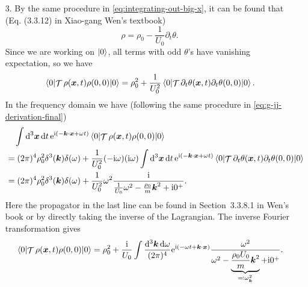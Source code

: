 \documentclass[hyperref, a4paper]{article}
\DeclareMathOperator{\timeorder}{\mathcal{T}}
\newcommand*{\ii}{\mathrm{i}}
\newcommand*{\ee}{\mathrm{e}}
\begin{document}
\begin{enumerate}
\item[3.] By the same procedure in \eqref{eq:integrating-out-big-x},
it can be found that (Eq. (3.3.12) in Xiao-gang Wen's textbook) 
\begin{equation}
    \rho = \rho_0 - \frac{1}{U_0} \partial_t \theta.
\end{equation}
Since we are working on $\ket{0}$,
all terms with odd $\theta$'s have vanishing expectation,
so we have 
\begin{equation}
    \expval{\timeorder \rho(\vb*{x}, t) \rho(0, 0)}{0} 
    = \rho_0^2 + \frac{1}{U_0^2} \expval{\timeorder \partial_t \theta(\vb*{x}, t) \partial_t \theta (0, 0)}{0}.
\end{equation}
In the frequency domain we have (following the same procedure in \eqref{eq:g-jj-derivation-final})
\begin{equation}
    \begin{aligned}
        &\quad \int \dd[3]{\vb*{x}} \dd{t} \ee^{\ii (- \vb*{k} \cdot \vb*{x} + \omega t)} 
        \expval{\timeorder \rho(\vb*{x}, t) \rho(0, 0)}{0}  \\
        &= (2\pi)^4 \rho_0^2 \delta^3(\vb*{k}) \delta(\omega)
        + \frac{1}{U_0^2} (-\ii \omega) (\ii \omega) 
        \int \dd[3]{\vb*{x}} \dd{t} \ee^{\ii (- \vb*{k} \cdot \vb*{x} + \omega t)} 
        \expval{\timeorder \partial_t \theta(\vb*{x}, t) \partial_t \theta (0, 0)}{0} \\
        &= (2\pi)^4 \rho_0^2 \delta^3(\vb*{k}) \delta(\omega)
        + \frac{1}{U_0^2} \omega^2 \frac{\ii}{ \frac{1}{U_0} \omega^2 - \frac{\rho_0}{m} \vb*{k}^2 + \ii 0^+ }.
    \end{aligned}
\end{equation}
Here the propagator in the last line can be found in Section~3.3.8.1 in Wen's book
or by directly taking the inverse of the Lagrangian.
The inverse Fourier transformation gives 
\begin{equation}
    \expval{\timeorder \rho(\vb*{x}, t) \rho(0, 0)}{0} = 
    \rho_0^2 + \frac{\ii}{U_0} \int \frac{\dd[3]{\vb*{k}} \dd{\omega}}{(2\pi)^4} 
    \ee^{\ii (- \omega t + \vb*{k} \cdot \vb*{x})}
    \frac{\omega^2}{\omega^2 - \underbrace{\frac{\rho_0 U_0}{m} \vb*{k}^2}_{\eqqcolon \omega_{\vb*{k}}^2} + \ii 0^+}.
\end{equation}


\end{enumerate}
\end{document}

